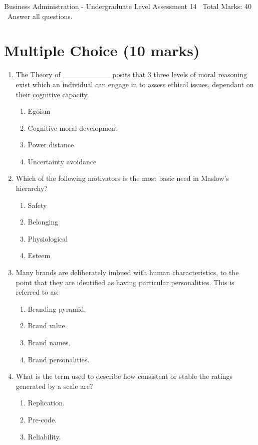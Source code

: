 \documentclass[12pt]{article}
\begin{document}
\begin{center}
Business Administration - Undergraduate Level Assessment 14 \
Total Marks: 40 \
Answer all questions.
\end{center}

\section*{Multiple Choice (10 marks)}
\begin{enumerate}[label=\arabic*.]
\item The Theory of \_\_\_\_\_\_\_\_\_ posits that 3 three levels of moral reasoning exist which an individual can engage in to assess ethical issues, dependant on their cognitive capacity.
\begin{enumerate}[label=(\alph*)]
    \item Egoism
    \item Cognitive moral development
    \item Power distance
    \item Uncertainty avoidance
\end{enumerate}
\item Which of the following motivators is the most basic need in Maslow's hierarchy?
\begin{enumerate}[label=(\alph*)]
    \item Safety
    \item Belonging
    \item Physiological
    \item Esteem
\end{enumerate}
\item Many brands are deliberately imbued with human characteristics, to the point that they are identified as having particular personalities. This is referred to as:
\begin{enumerate}[label=(\alph*)]
    \item Branding pyramid.
    \item Brand value.
    \item Brand names.
    \item Brand personalities.
\end{enumerate}
\item What is the term used to describe how consistent or stable the ratings generated by a scale are?
\begin{enumerate}[label=(\alph*)]
    \item Replication.
    \item Pre-code.
    \item Reliability.

\end{enumerate}
\end{enumerate}
\end{document}
